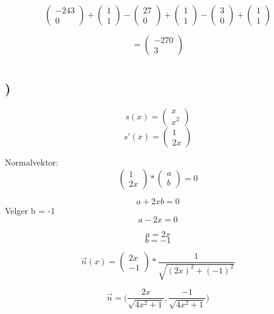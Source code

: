 \documentclass[a4paper,10pt,norsk]{article}
\begin{document}
\[\left(\begin{matrix} -243\\0 \end{matrix}\right) + \left(\begin{matrix} 1\\1 \end{matrix}\right) - \left(\begin{matrix} 27\\0 \end{matrix}\right) + \left(\begin{matrix} 1\\1 \end{matrix}\right) - \left(\begin{matrix} 3\\0 \end{matrix}\right) + \left(\begin{matrix} 1\\1 \end{matrix}\right)\]

\[=\left(\begin{matrix} -270\\3 \end{matrix}\right)\]

\section{}

\subsection{)}

\begin{center}

\[s(x) = \left(\begin{matrix} x\\x^{2} \end{matrix}\right)\]
\[s'(x) = \left(\begin{matrix} 1\\2x \end{matrix}\right)\]

Normalvektor:
\[\left(\begin{matrix} 1\\2x \end{matrix}\right) * \left(\begin{matrix} a\\b \end{matrix}\right) = 0\]

\[a + 2xb = 0\]
Velger b = -1
\[a - 2x = 0\]

\[a = 2x\]
\[b = -1\]

\[\vec{n}(x) = \left(\begin{matrix} 2x\\-1 \end{matrix}\right) * \frac{1}{\sqrt{(2x)^{2} + (-1)^{2}}}\]

\[\vec{n} = \Bigg( \frac{2x}{\sqrt{4x^{2} + 1}}, \frac{-1}{\sqrt{4x^{2} + 1}} \Bigg)\]

\end{center}
\end{document}
